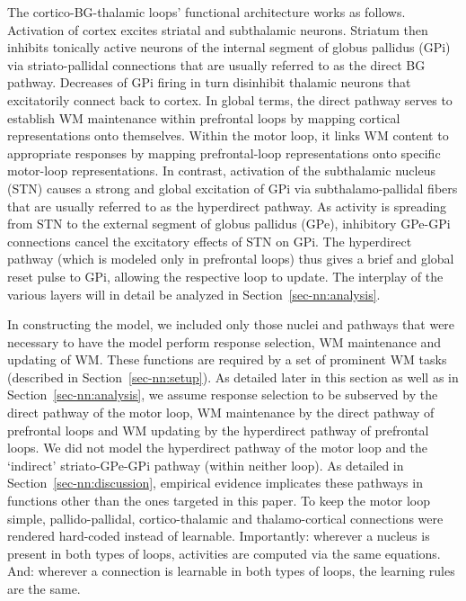 \documentclass[
  11pt,
  a4paper,
]{scrbook}
\begin{document}
The cortico-BG-thalamic loops' functional architecture works as follows.
Activation of cortex excites striatal and subthalamic neurons. Striatum
then inhibits tonically active neurons of the internal segment of globus
pallidus (GPi) via striato-pallidal connections that are usually
referred to as the direct BG pathway. Decreases of GPi firing in turn
disinhibit thalamic neurons that excitatorily connect back to cortex. In
global terms, the direct pathway serves to establish WM maintenance
within prefrontal loops by mapping cortical representations onto
themselves. Within the motor loop, it links WM content to appropriate
responses by mapping prefrontal-loop representations onto specific
motor-loop representations. In contrast, activation of the subthalamic
nucleus (STN) causes a strong and global excitation of GPi via
subthalamo-pallidal fibers that are usually referred to as the
hyperdirect pathway. As activity is spreading from STN to the external
segment of globus pallidus (GPe), inhibitory GPe-GPi connections cancel
the excitatory effects of STN on GPi. The hyperdirect pathway (which is
modeled only in prefrontal loops) thus gives a brief and global reset
pulse to GPi, allowing the respective loop to update. The interplay of
the various layers will in detail be analyzed in
Section~\ref{sec-nn:analysis}.

In constructing the model, we included only those nuclei and pathways
that were necessary to have the model perform response selection, WM
maintenance and updating of WM. These functions are required by a set of
prominent WM tasks (described in Section~\ref{sec-nn:setup}). As
detailed later in this section as well as in
Section~\ref{sec-nn:analysis}, we assume response selection to be
subserved by the direct pathway of the motor loop, WM maintenance by the
direct pathway of prefrontal loops and WM updating by the hyperdirect
pathway of prefrontal loops. We did not model the hyperdirect pathway of
the motor loop and the `indirect' striato-GPe-GPi pathway (within
neither loop). As detailed in Section~\ref{sec-nn:discussion}, empirical
evidence implicates these pathways in functions other than the ones
targeted in this paper. To keep the motor loop simple, pallido-pallidal,
cortico-thalamic and thalamo-cortical connections were rendered
hard-coded instead of learnable. Importantly: wherever a nucleus is
present in both types of loops, activities are computed via the same
equations. And: wherever a connection is learnable in both types of
loops, the learning rules are the same.
\end{document}
